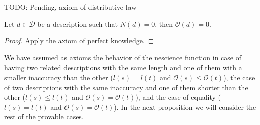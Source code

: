 {\color{red} TODO: Pending, axiom of distributive law}

\begin{proposition}
Let $d \in \mathcal{D}$ be a description such that $N(d)=0$, then $\mathcal{O}(d)=0$.
\end{proposition}
\begin{proof}
Apply the axiom of perfect knowledge.
\end{proof}

We have assumed as axioms the behavior of the nescience function in case of having two related descriptions with the same length and one of them with a smaller inaccuracy than the other ($l(s) = l(t)$ and $\mathcal{O} (s) \leq \mathcal{O} (t)$), the case of two descriptions with the same inaccuracy and one of them shorter than the other ($l(s) \leq l(t)$ and $\mathcal{O} (s) = \mathcal{O} (t)$), and the case of equality ($l(s) = l(t)$ and $\mathcal{O} (s) = \mathcal{O} (t)$). In the next proposition we will consider the rest of the provable cases.

